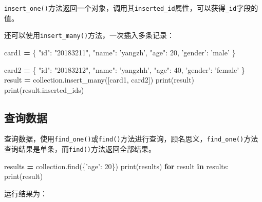 \documentclass[]{ctexbook}
\newenvironment{Shaded}{\begin{snugshade}}{\end{snugshade}}
\newcommand{\BuiltInTok}[1]{#1}
\newcommand{\ControlFlowTok}[1]{\textcolor[rgb]{0.13,0.29,0.53}{\textbf{#1}}}
\newcommand{\DecValTok}[1]{\textcolor[rgb]{0.00,0.00,0.81}{#1}}
\newcommand{\KeywordTok}[1]{\textcolor[rgb]{0.13,0.29,0.53}{\textbf{#1}}}
\newcommand{\NormalTok}[1]{#1}
\newcommand{\OperatorTok}[1]{\textcolor[rgb]{0.81,0.36,0.00}{\textbf{#1}}}
\newcommand{\StringTok}[1]{\textcolor[rgb]{0.31,0.60,0.02}{#1}}
\begin{document}
\texttt{insert\_one()}方法返回一个对象，调用其\texttt{inserted\_id}属性，可以获得\texttt{\_id}字段的值。

还可以使用\texttt{insert\_many()}方法，一次插入多条记录：

\begin{Shaded}
\begin{Highlighting}[]
\NormalTok{card1 }\OperatorTok{=}\NormalTok{ \{}
    \StringTok{"id"}\NormalTok{: }\StringTok{"20183211"}\NormalTok{,}
    \StringTok{"name"}\NormalTok{: }\StringTok{'yangzh'}\NormalTok{,}
    \StringTok{"age"}\NormalTok{: }\DecValTok{20}\NormalTok{,}
    \StringTok{'gender'}\NormalTok{: }\StringTok{'male'}
\NormalTok{\}}

\NormalTok{card2 }\OperatorTok{=}\NormalTok{ \{}
    \StringTok{"id"}\NormalTok{: }\StringTok{"20183212"}\NormalTok{,}
    \StringTok{"name"}\NormalTok{: }\StringTok{'yangzhh'}\NormalTok{,}
    \StringTok{"age"}\NormalTok{: }\DecValTok{40}\NormalTok{,}
    \StringTok{'gender'}\NormalTok{: }\StringTok{'female'}
\NormalTok{\}}
\NormalTok{result }\OperatorTok{=}\NormalTok{ collection.insert_many([card1, card2])}
\BuiltInTok{print}\NormalTok{(result)}
\BuiltInTok{print}\NormalTok{(result.inserted_ids)}
\end{Highlighting}
\end{Shaded}

\hypertarget{ux67e5ux8be2ux6570ux636e-1}{%
\subsection{查询数据}\label{ux67e5ux8be2ux6570ux636e-1}}

查询数据，使用\texttt{find\_one()}或\texttt{find()}方法进行查询，顾名思义，\texttt{find\_one()}方法查询结果是单条，而\texttt{find()}方法返回全部结果。

\begin{Shaded}
\begin{Highlighting}[]
\NormalTok{results }\OperatorTok{=}\NormalTok{ collection.find(\{}\StringTok{'age'}\NormalTok{: }\DecValTok{20}\NormalTok{\})}
\BuiltInTok{print}\NormalTok{(results)}
\ControlFlowTok{for}\NormalTok{ result }\KeywordTok{in}\NormalTok{ results:}
    \BuiltInTok{print}\NormalTok{(result)}
\end{Highlighting}
\end{Shaded}

运行结果为：
\end{document}
